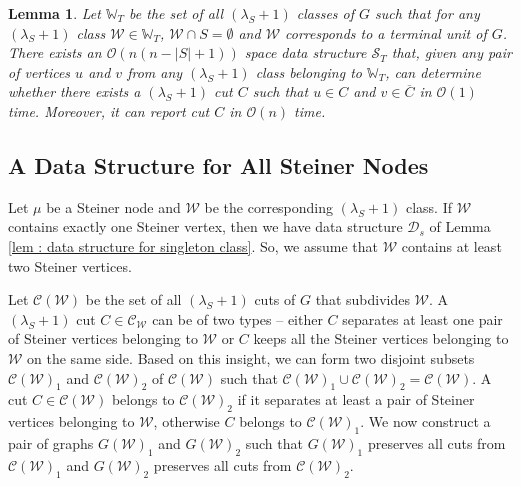 \documentclass[letterpaper,11pt]{article}
\newtheorem{lemma}{Lemma}[]
\begin{document}
\begin{lemma}
    \label{lem : data structure for terminal nonSteiner units}
    Let ${\mathbb W}_T$ be the set of all $(\lambda_S+1)$ classes of $G$ such that for any $(\lambda_S+1)$ class ${\mathcal W}\in {\mathbb W}_T$, ${\mathcal W}\cap S=\emptyset$ and ${\mathcal W}$ corresponds to a terminal unit of $G$. There exists an ${\mathcal O}(n(n-|S|+1))$ space data structure ${\mathcal S}_T$ that, given any pair of vertices $u$ and $v$ from any $(\lambda_S+1)$ class belonging to ${\mathbb W}_T$, can determine whether there exists a $(\lambda_S+1)$ cut $C$ such that $u\in C$ and $v\in \overline{C}$ in ${\mathcal O}(1)$ time. Moreover, it can report cut $C$ in ${\mathcal O}(n)$ time.
\end{lemma}



\subsection{A Data Structure for All Steiner Nodes} \label{sec : generic steiner node}
Let $\mu$ be a Steiner node and ${\mathcal W}$ be the corresponding $(\lambda_S+1)$ class. If ${\mathcal W}$ contains exactly one Steiner vertex, then we have data structure ${\mathcal D}_s$ of Lemma \ref{lem : data structure for singleton class}. So, we assume that ${\mathcal W}$ contains at least two Steiner vertices. 

Let ${\mathcal C}({\mathcal W})$ be the set of all $(\lambda_S+1)$ cuts of $G$ that subdivides ${\mathcal W}$. A $(\lambda_S+1)$ cut $C\in {\mathcal C}_{\mathcal W}$ can be of two types -- either $C$ separates at least one pair of Steiner vertices belonging to ${\mathcal W}$ or $C$ keeps all the Steiner vertices belonging to ${\mathcal W}$ on the same side. Based on this insight, we can form two disjoint subsets ${\mathcal C}({\mathcal W})_1$ and ${\mathcal C}({\mathcal W})_2$ of ${\mathcal C}({\mathcal W})$ such that ${\mathcal C}({\mathcal W})_1 \cup {\mathcal C}({\mathcal W})_2={\mathcal C}({\mathcal W})$. A cut $C\in {\mathcal C}({\mathcal W})$ belongs to ${\mathcal C}({\mathcal W})_2$ if it separates at least a pair of Steiner vertices belonging to ${\mathcal W}$, otherwise $C$ belongs to ${\mathcal C}({\mathcal W})_1$. We now construct a pair of graphs $G({\mathcal W})_1$ and $G({\mathcal W})_2$ such that $G({\mathcal W})_1$ preserves all cuts from ${\mathcal C}({\mathcal W})_1$ and $G({\mathcal W})_2$ preserves all cuts from ${\mathcal C}({\mathcal W})_2$.\\
\end{document}
